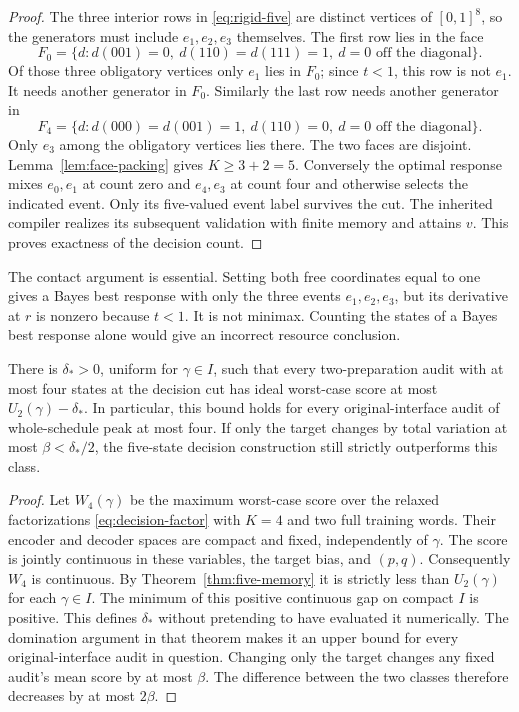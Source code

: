 \begin{proof}
The three interior rows in \eqref{eq:rigid-five} are distinct vertices
of $[0,1]^8$, so the generators must include $e_1,e_2,e_3$ themselves.
The first row lies in the face
\[
 F_0=\{d:d(001)=0,\ d(110)=d(111)=1,\ d=0\text{ off the diagonal}\}.
\]
Of those three obligatory vertices only $e_1$ lies in $F_0$; since
$t<1$, this row is not $e_1$. It needs another generator in $F_0$.
Similarly the last row needs another generator in
\[
 F_4=\{d:d(000)=d(001)=1,\ d(110)=0,\ d=0\text{ off the diagonal}\}.
\]
Only $e_3$ among the obligatory vertices lies there. The two faces are
disjoint. Lemma~\ref{lem:face-packing} gives $K\ge3+2=5$.
Conversely the optimal response mixes $e_0,e_1$ at count zero and
$e_4,e_3$ at count four and otherwise selects the indicated event.
Only its five-valued event label survives the cut. The inherited
compiler realizes its subsequent validation with finite memory and
attains $v$. This proves exactness of the decision count.
\end{proof}

The contact argument is essential. Setting both free coordinates equal
to one gives a Bayes best response with only the three events
$e_1,e_2,e_3$, but its derivative at $r$ is nonzero because $t<1$.
It is not minimax. Counting the states of a Bayes best response alone
would give an incorrect resource conclusion.

\begin{corollary}
\label{cor:strict-four}
There is $\delta_*>0$, uniform for $\gamma\in I$, such that every
two-preparation audit with at most four states at the decision cut has
ideal worst-case score at most $U_2(\gamma)-\delta_*$. In particular,
this bound holds for every original-interface audit of whole-schedule
peak at most four. If only the target changes by total variation at
most $\beta<\delta_*/2$, the five-state decision construction still
strictly outperforms this class.
\end{corollary}
\begin{proof}
Let $W_4(\gamma)$ be the maximum worst-case score over the relaxed
factorizations \eqref{eq:decision-factor} with $K=4$ and two full
training words. Their encoder and decoder spaces are compact and fixed,
independently of $\gamma$. The score is jointly continuous in these
variables, the target bias, and $(p,q)$. Consequently $W_4$ is continuous.
By Theorem~\ref{thm:five-memory} it is strictly less than $U_2(\gamma)$
for each $\gamma\in I$. The minimum of this positive continuous gap on
compact $I$ is positive. This defines $\delta_*$ without pretending to
have evaluated it numerically. The domination argument in that theorem
makes it an upper bound for every original-interface audit in question.
Changing only the target changes any fixed audit's mean score by at
most $\beta$. The difference between the two classes therefore decreases
by at most $2\beta$.
\end{proof}

